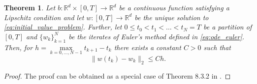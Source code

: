 \documentclass[12pt]{article}
\newtheorem{theorem}{Theorem}[section]
\theoremstyle{definition}
\numberwithin{equation}{section}
\newcommand{\R}{\mathbb{R}}
\newcommand{\norm}[1]{\lVert{#1}\rVert_2}
\begin{document}
\begin{theorem}
  \label{thm:euler_convergence}
  Let $b : \R^d \times [0,T] \rightarrow \R^d$ be a continuous function satisfying a Lipschitz condition and let $w:[0,T] \rightarrow \R^d$ be the unique solution to \eqref{eq:initial_value_problem}. Further, let $0 \leq t_0 < t_1 < \dots < t_N = T$ be a partition of $[0,T]$ and $\{w_k\}_{k=1}^N$ be the iterates of Euler's method defined in \eqref{eq:ode_euler}. Then, for $h = \max\limits_{k=0,\dots,N-1} t_{k+1} - t_k$ there exists a constant $C > 0$ such that
  \begin{equation*}
    \norm{w(t_k) - w_k} \leq C h.
  \end{equation*}
\end{theorem}
\begin{proof}
  The proof can be obtained as a special case of Theorem 8.3.2 in \cite[pp.~294]{kloedenNumericalSolutionStochastic2013}.
\end{proof}
\end{document}
